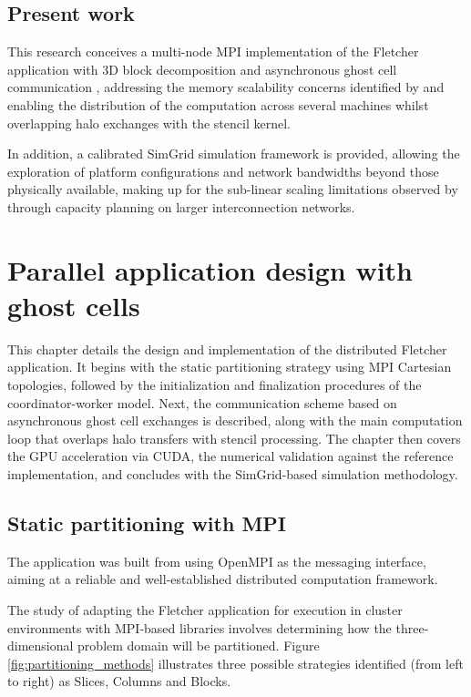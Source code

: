\documentclass[cic,tc,english]{infufrgs}
\begin{document}
\section{Present work}

This research conceives a multi-node MPI implementation of the
Fletcher application \cite{fletcher_modeling} with 3D block
decomposition \cite{stencil_supercomputers} and asynchronous ghost
cell communication \cite{ghost_cells}, addressing the memory
scalability concerns identified by \cite{multi-gpu, okamoto2010} and
enabling the distribution of the computation across several machines
whilst overlapping halo exchanges with the stencil kernel.

In addition, a calibrated SimGrid simulation framework \cite{simgrid}
is provided, allowing the exploration of platform configurations and
network bandwidths beyond those physically available, making up for
the sub-linear scaling limitations observed by \cite{okamoto2010}
through capacity planning on larger interconnection networks.

\chapter{Parallel application design with ghost cells}
\label{ch:application_design}

This chapter details the design and implementation of the distributed
Fletcher application. It begins with the static partitioning strategy
using MPI Cartesian topologies, followed by the initialization and
finalization procedures of the coordinator-worker model. Next, the
communication scheme based on asynchronous ghost cell exchanges is
described, along with the main computation loop that overlaps halo
transfers with stencil processing. The chapter then covers the GPU
acceleration via CUDA, the numerical validation against the reference
implementation, and concludes with the SimGrid-based simulation
methodology.

\section{Static partitioning with MPI}
The application was built from using OpenMPI as the
messaging interface, aiming at a reliable and well-established
distributed computation framework.

The study of adapting the Fletcher application for execution in cluster
environments with MPI-based libraries involves determining how the
three-dimensional problem domain will be partitioned. Figure
\ref{fig:partitioning_methods} illustrates three possible strategies
identified (from left to right) as Slices, Columns and Blocks.
\end{document}
